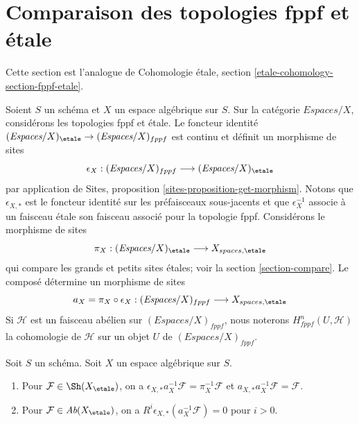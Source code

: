 






\section{Comparaison des topologies fppf et étale}
\label{section-fppf-etale}

\noindent
Cette section est l'analogue de Cohomologie étale, section
\ref{etale-cohomology-section-fppf-etale}.

\medskip\noindent
Soient $S$ un schéma et $X$ un espace algébrique sur $S$.
Sur la catégorie $\textit{Espaces}/X$, considérons les topologies fppf
et étale. Le foncteur identité
$(\textit{Espaces}/X)_\etale \to (\textit{Espaces}/X)_{fppf}$
est continu et définit un morphisme de sites
$$
\epsilon_X :
(\textit{Espaces}/X)_{fppf} \longrightarrow (\textit{Espaces}/X)_\etale
$$
par application de Sites, proposition \ref{sites-proposition-get-morphism}.
Notons que $\epsilon_{X, *}$ est le foncteur identité sur les préfaisceaux
sous-jacents et que $\epsilon_X^{-1}$ associe à un faisceau étale son
faisceau associé pour la topologie fppf.
Considérons le morphisme de sites
$$
\pi_X : (\textit{Espaces}/X)_\etale \longrightarrow X_{spaces, \etale}
$$
qui compare les grands et petits sites étales; voir la section \ref{section-compare}.
Le composé détermine un morphisme de sites
$$
a_X = \pi_X \circ \epsilon_X :
(\textit{Espaces}/X)_{fppf}
\longrightarrow
X_{spaces, \etale}
$$
Si $\mathcal{H}$ est un faisceau abélien sur $(\textit{Espaces}/X)_{fppf}$,
nous noterons $H^n_{fppf}(U, \mathcal{H})$ la cohomologie de
$\mathcal{H}$ sur un objet $U$ de $(\textit{Espaces}/X)_{fppf}$.

\begin{lemma}
\label{lemma-comparison-fppf-etale}
Soit $S$ un schéma. Soit $X$ un espace algébrique sur $S$.
\begin{enumerate}
\item Pour $\mathcal{F} \in \Sh(X_\etale)$, on a
$\epsilon_{X, *}a_X^{-1}\mathcal{F} = \pi_X^{-1}\mathcal{F}$
et $a_{X, *}a_X^{-1}\mathcal{F} = \mathcal{F}$.
\item Pour $\mathcal{F} \in \textit{Ab}(X_\etale)$, on a
$R^i\epsilon_{X, *}(a_X^{-1}\mathcal{F}) = 0$ pour $i > 0$.
\end{enumerate}
\end{lemma}

